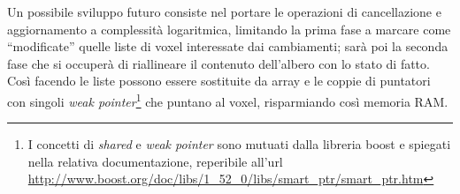 Un possibile sviluppo futuro consiste nel portare le operazioni di cancellazione e aggiornamento a complessità logaritmica, limitando la prima fase a marcare come ``modificate'' quelle liste di voxel interessate dai cambiamenti; sarà poi la seconda fase che si occuperà di riallineare il contenuto dell'albero con lo stato di fatto. Così facendo le liste possono essere sostituite da array e le coppie di puntatori con singoli \emph{weak pointer}\footnote{I concetti di \emph{shared} e \emph{weak pointer} sono mutuati dalla libreria boost e spiegati nella relativa documentazione, reperibile all'url \url{http://www.boost.org/doc/libs/1_52_0/libs/smart_ptr/smart_ptr.htm}} che puntano al voxel, risparmiando così memoria RAM.
